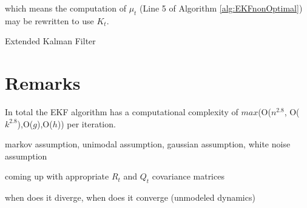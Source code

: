 which means the computation of \(\mu_t\) (Line 5 of Algorithm \ref{alg:EKFnonOptimal}) may be rewritten to use \(K_t\).

\begin{algorithm} 
	\caption{Extended Kalman Filter}
	\label{alg:EKFOptimal}
	\begin{algorithmic}[1]
		\State {}
		\EndFunction
	\end{algorithmic}
\end{algorithm}

\section{Remarks}
In total the EKF algorithm has a computational complexity of \(max\)(O(\(n^{2.8}\), O(\(k^{2.8}\)),O(\(g\)),O(\(h\))) per iteration.

markov assumption, unimodal assumption, gaussian assumption, white noise assumption

coming up with appropriate \(R_t\) and \(Q_t\) covariance matrices

when does it diverge, when does it converge (unmodeled dynamics)